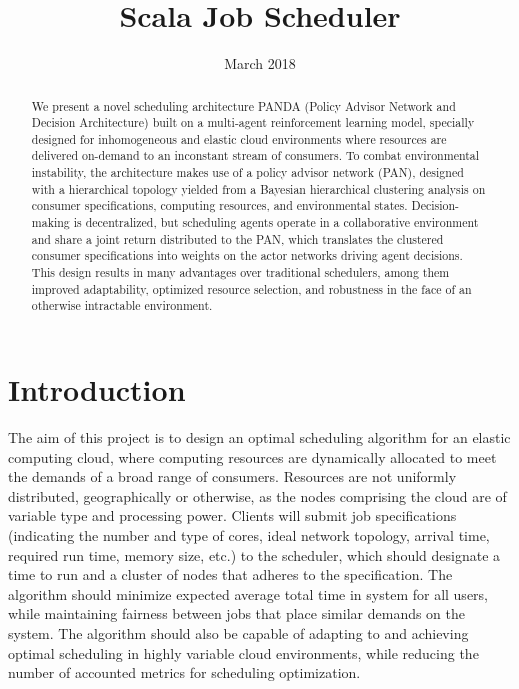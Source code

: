 \documentclass{article}
\title{Scala Job Scheduler}
\date{March 2018}
\theoremstyle{definition}
\theoremstyle{remark}
\begin{document}
	\maketitle

	\begin{abstract}
		We present a novel scheduling architecture PANDA (Policy Advisor Network and Decision Architecture) built on a multi-agent reinforcement learning model, specially designed for inhomogeneous and elastic cloud environments where resources are delivered on-demand to an inconstant stream of consumers. To combat environmental instability, the architecture makes use of a policy advisor network (PAN), designed with a hierarchical topology yielded from a Bayesian hierarchical clustering analysis on consumer specifications, computing resources, and environmental states. Decision-making is decentralized, but scheduling agents operate in a collaborative environment and share a joint return distributed to the PAN, which translates the clustered consumer specifications into weights on the actor networks driving agent decisions. This design results in many advantages over traditional schedulers, among them improved adaptability, optimized resource selection, and robustness in the face of an otherwise intractable environment.
	\end{abstract}

	\newpage


	\section*{Introduction}

	The aim of this project is to design an optimal scheduling algorithm for an elastic computing cloud, where computing resources are dynamically allocated to meet the demands of a broad range of consumers. Resources are not uniformly distributed, geographically or otherwise, as the nodes comprising the cloud are of variable type and processing power. Clients will submit job specifications (indicating the number and type of cores, ideal network topology, arrival time, required run time, memory size, etc.) to the scheduler, which should designate a time to run and a cluster of nodes that adheres to the specification. The algorithm should minimize expected average total time in system for all users, while maintaining fairness between jobs that place similar demands on the system. The algorithm should also be capable of adapting to and achieving optimal scheduling in highly variable cloud environments, while reducing the number of accounted metrics for scheduling optimization.
\end{document}
